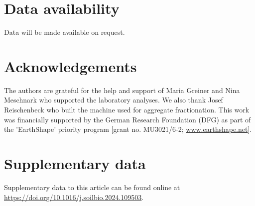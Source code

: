 \section*{Data availability}

Data will be made available on request.

\section*{Acknowledgements}

The authors are grateful for the help and support of Maria Greiner and Nina Meschnark who supported the laboratory analyses. 
We also thank Josef Reischenbeck who built the machine used for aggregate fractionation. This work was financially supported by the German Research Foundation (DFG) as part of the 'EarthShape' priority program [grant no. MU3021/6-2; \url{www.earthshape.net}].

\section*{Supplementary data}

Supplementary data to this article can be found online at \url{https://doi.org/10.1016/j.soilbio.2024.109503}.



